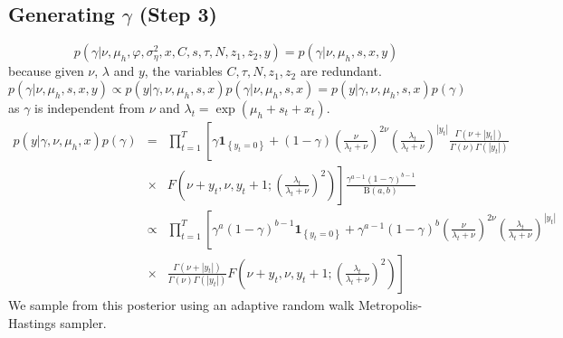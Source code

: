 \documentclass[12pt]{article}
\newcommand\mathbbm[1]{\mathbf{#1}}
\begin{document}
\subsection{Generating  $\gamma$ (Step 3)}
\begin{equation}
p(\gamma | \nu, \mu_{h} ,\varphi,\sigma^{2}_{\eta},x ,C , s,\tau, N,z_1 , z_2 , y)=p(\gamma | \nu, \mu_{h},s ,x ,y)
\end{equation}
because given $\nu$, $\lambda$ and $y$, the variables $C , \tau, N ,z_1 , z_2 $ are redundant. 
\begin{equation}
p(\gamma |\nu, \mu_{h},s ,x ,y)
\propto p(y|\gamma,\nu ,\mu_{h} ,s,x) p(\gamma|\nu,\mu_{h} ,s,x)= p(y|\gamma, \nu, \mu_{h} ,s,x)p(\gamma)
\end{equation}
as  $\gamma$ is independent from $\nu$ and  $\lambda_t=\exp(\mu_{h}+ s_t+x_t)$. 
\begin{eqnarray}
p(y|\gamma,\nu,\mu_{h} ,x)p(\gamma)&=&\prod \limits_{t=1}^{T} \left[ \gamma \mathbbm{1}_{\left\{y_t =0 \right\}} + (1-\gamma)  \left(\frac{\nu}{ \lambda_t+\nu}\right)^{2\nu}\left(\frac{\lambda_t}{ \lambda_t+\nu}\right)^{|y_t |} \frac{\Gamma(\nu+|y_t |) }{\Gamma(\nu)\Gamma(|y_t |)} \right. \nonumber \\
&\times & \left. F\left(\nu+y_t , \nu, y_t+1; \left(\frac{\lambda_t}{ \lambda_t+\nu}\right)^2\right) \right] \frac{\gamma^{a-1}(1-\gamma)^{b-1}}{\text{B}(a,b)} \nonumber \\
&\propto& \prod \limits_{t=1}^{T} \left[ \gamma^{a}(1-\gamma)^{b-1} \mathbbm{1}_{\left\{y_t =0 \right\}} + \gamma^{a-1}(1-\gamma)^{b} \left(\frac{\nu}{ \lambda_t+\nu}\right)^{2\nu}\left(\frac{\lambda_t}{ \lambda_t+\nu}\right)^{|y_t |} \right. \nonumber \\
&\times& \frac{\Gamma(\nu+|y_t |) }{\Gamma(\nu)\Gamma(|y_t |)}  \left. F\left(\nu+y_t , \nu, y_t+1; \left(\frac{\lambda_t}{ \lambda_t+\nu}\right)^2\right)   \right] \nonumber 
\end{eqnarray}
We sample from this posterior using an adaptive random walk Metropolis-Hastings sampler.
\end{document}
